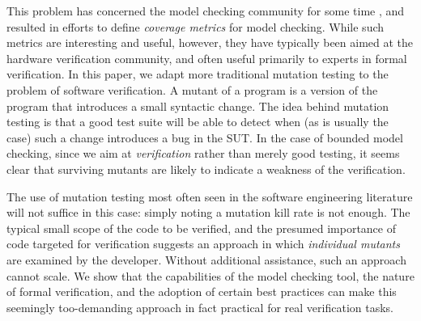 \documentclass[conference]{IEEEtran}
\begin{document}
This problem has concerned the model checking community for some time
\cite{Hoskote,PracticalCov}, and resulted in efforts to define \emph{coverage
  metrics} for model checking.  While such metrics are interesting and
useful, however, they have typically been aimed at the hardware
verification community, and often useful primarily to experts in
formal verification.  In this paper, we adapt more traditional mutation
testing \cite{mutation1,mutation2} to the problem of software
verification.  A mutant of a program is a version of the program that
introduces a small syntactic change.  The idea behind mutation testing
is that a good test suite will be able to detect when (as is usually
the case) such a change introduces a bug in the SUT.  In the case of
bounded model checking, since we aim at \emph{verification} rather
than merely good testing, it seems clear that surviving mutants are
likely to indicate a weakness of the verification.

The use of mutation testing most often seen in the software
engineering literature will not suffice in this case: simply noting a
mutation kill rate is not enough.  The typical small scope of the code to be
verified, and the presumed importance of code targeted for verification suggests
an approach in which \emph{individual mutants} are examined by the
developer.  Without additional assistance, such an approach cannot
scale.  We show that the capabilities of the model checking tool, the
nature of formal verification, and the adoption of certain best
practices can make this seemingly too-demanding approach in fact
practical for real verification tasks.

\begin{comment}
Our basic idea is to use mutants \emph{throughout the verification
  effort}, even in choosing a bound for bounded model checking.  At
each stage the developer examines the currently surviving mutants,
either by inspecting the mutated code or (when this does not make the
reason the mutant is not detected clear) looking at \emph{successful
  executions covering the mutant but satisfying the specification
  given in the harness}.  For critical verification tasks, we suggest
that developers not only examine the passing executions of surviving
mutants, but the passing executions of \emph{killed mutants}.  While
examining test cases that do not kill a given mutant could be useful
in traditional testing, the model checker makes a much more potent
investigation possible, where a developer can constrain the behavior
to force the mutant's behavior to matter, if that is possible, and
automatically find passing executions that maximize coverage
(including the mutated code).  We also propose that a developer should
use mutants of the test harness itself to ensure that no similar
harness has a better mutant kill rate, and that most mutants of the
harness reject the SUT itself.

\subsection{Contributions}
\end{comment}
\end{document}
